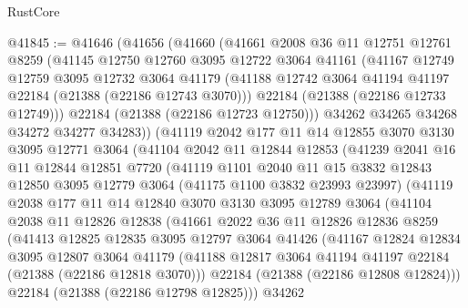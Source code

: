 \begin{lexlean}{RustCore}
\begin{coremodule}
@41845 := @41646
    (@41656
      (@41660
        (@41661
          @2008
          @36
          @11
          @12751
          @12761
          @8259
          (@41145
            @12750
            @12760
            @3095
            @12722
            @3064
            @41161
            (@41167
              @12749
              @12759
              @3095
              @12732
              @3064
              @41179
              (@41188 @12742 @3064 @41194 @41197 @22184 (@21388 (@22186 @12743 @3070)))
              @22184
              (@21388 (@22186 @12733 @12749)))
            @22184
            (@21388 (@22186 @12723 @12750)))
          @34262
          @34265
          @34268
          @34272
          @34277
          @34283))
      (@41119
        @2042
        @177
        @11
        @14
        @12855
        @3070
        @3130
        @3095
        @12771
        @3064
        (@41104
          @2042
          @11
          @12844
          @12853
          (@41239
            @2041
            @16
            @11
            @12844
            @12851
            @7720
            (@41119
              @1101
              @2040
              @11
              @15
              @3832
              @12843
              @12850
              @3095
              @12779
              @3064
              (@41175 @1100 @3832 @23993 @23997)
              (@41119
                @2038
                @177
                @11
                @14
                @12840
                @3070
                @3130
                @3095
                @12789
                @3064
                (@41104
                  @2038
                  @11
                  @12826
                  @12838
                  (@41661
                    @2022
                    @36
                    @11
                    @12826
                    @12836
                    @8259
                    (@41413
                      @12825
                      @12835
                      @3095
                      @12797
                      @3064
                      @41426
                      (@41167
                        @12824
                        @12834
                        @3095
                        @12807
                        @3064
                        @41179
                        (@41188 @12817 @3064 @41194 @41197 @22184 (@21388 (@22186 @12818 @3070)))
                        @22184
                        (@21388 (@22186 @12808 @12824)))
                      @22184
                      (@21388 (@22186 @12798 @12825)))
                    @34262

\end{coremodule}
\end{lexlean}
